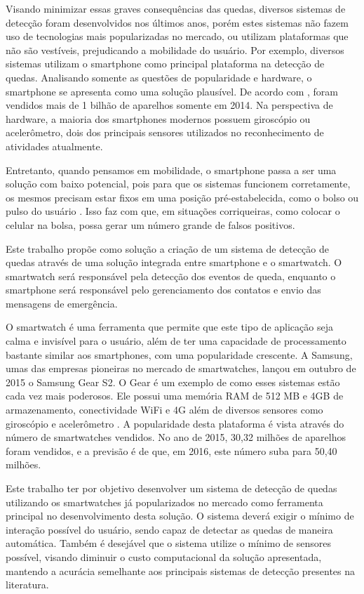 Visando minimizar essas graves consequências das quedas, diversos sistemas de detecção foram desenvolvidos nos últimos anos, porém estes sistemas não fazem uso de tecnologias mais popularizadas no mercado, ou utilizam plataformas que não são vestíveis, prejudicando a mobilidade do usuário. Por exemplo, diversos sistemas utilizam o smartphone como principal plataforma na detecção de quedas. Analisando somente as questões de popularidade e hardware, o smartphone se apresenta como uma solução plausível. De acordo com \cite{smartphoneSales:15}, foram vendidos mais de 1 bilhão de aparelhos somente em 2014. Na perspectiva de hardware, a maioria dos smartphones modernos possuem giroscópio ou  acelerômetro, dois dos principais sensores utilizados no reconhecimento de atividades atualmente.
 
Entretanto, quando pensamos em mobilidade, o smartphone passa a ser uma solução com baixo potencial,  pois para que os sistemas funcionem corretamente, os mesmos precisam estar fixos em uma posição pré-estabelecida, como o bolso ou pulso do usuário \citep{FallDectionSmartPhone:12}. Isso faz com que, em situações corriqueiras, como colocar o celular na bolsa, possa gerar um número grande de falsos positivos.

Este trabalho propõe como solução a criação de um sistema de detecção de quedas através de uma solução integrada entre smartphone e o smartwatch. O smartwatch será responsável pela detecção dos eventos de queda, enquanto o smartphone será responsável pelo gerenciamento dos contatos e envio das mensagens de emergência. 

O smartwatch é uma ferramenta que permite que este tipo de aplicação seja calma e invisível para o usuário, além de ter uma capacidade de processamento bastante similar aos smartphones, com uma popularidade crescente. A Samsung, umas das empresas pioneiras no mercado de smartwatches, lançou em outubro de 2015 o Samsung Gear S2. O Gear é um exemplo de como esses sistemas estão cada vez mais poderosos. Ele possui uma memória RAM de 512 MB e 4GB de armazenamento,  conectividade WiFi e 4G além de diversos sensores como giroscópio e acelerômetro \cite{samsungSpecification:16}. A popularidade desta plataforma é vista através do número de smartwatches vendidos. No ano de 2015, 30,32 milhões de aparelhos foram vendidos, e a previsão é de que, em 2016, este número suba para 50,40 milhões. 

Este trabalho ter por objetivo desenvolver um sistema de detecção de quedas utilizando os smartwatches já popularizados no mercado como ferramenta principal no desenvolvimento desta solução. O sistema deverá exigir o mínimo de interação possível do usuário, sendo capaz de detectar as quedas de maneira automática. Também é desejável que o sistema utilize o mínimo de sensores possível, visando diminuir o custo computacional da solução apresentada, mantendo a acurácia semelhante aos principais sistemas de detecção presentes na literatura.

